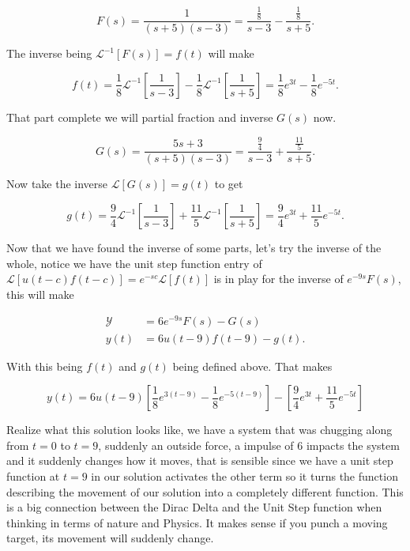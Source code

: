 \documentclass[12pt]{article}
\newcommand{\lp}{\mathscr{L}}
\newcommand{\hugey}{\mathscr{Y}}
\begin{document}
\begin{equation*}
    F(s)=\frac{1}{(s+5)(s-3)} = \frac{\frac{1}{8}}{s-3}-\frac{\frac{1}{8}}{s+5}.
\end{equation*}

The inverse being $\lp^{-1}[F(s)]=f(t)$ will make

\begin{equation*}
    f(t)=\frac{1}{8}\lp^{-1}\left[\frac{1}{s-3}\right]-\frac{1}{8}\lp^{-1}\left[\frac{1}{s+5}\right]=\frac{1}{8}e^{3t}-\frac{1}{8}e^{-5t}.
\end{equation*}

That part complete we will partial fraction and inverse $G(s)$ now.

\begin{equation*}
    G(s)=\frac{5s+3}{(s+5)(s-3)}=\frac{\frac{9}{4}}{s-3}+\frac{\frac{11}{5}}{s+5}.
\end{equation*}

Now take the inverse $\lp[G(s)]=g(t)$ to get

\begin{equation*}
    g(t)=\frac{9}{4}\lp^{-1}\left[\frac{1}{s-3}\right]+\frac{11}{5}\lp^{-1}\left[\frac{1}{s+5}\right]=\frac{9}{4}e^{3t}+\frac{11}{5}e^{-5t}.
\end{equation*}

Now that we have found the inverse of some parts, let's try the inverse of the whole, notice we have the unit step function entry of $\lp[u(t-c)f(t-c)]=e^{-sc}\lp[f(t)]$ is in play for the inverse of $e^{-9s}F(s)$, this will make

\begin{align*}
    \hugey &= 6e^{-9s}F(s)-G(s) \\
    y(t) &= 6u(t-9)f(t-9)-g(t).
\end{align*}

With this being $f(t)$ and $g(t)$ being defined above. That makes 

\begin{equation*}
    y(t) = 6u(t-9)\left[\frac{1}{8}e^{3(t-9)}-\frac{1}{8}e^{-5(t-9)}\right]-\left[\frac{9}{4}e^{3t}+\frac{11}{5}e^{-5t}\right]
\end{equation*}

Realize what this solution looks like, we have a system that was chugging along from $t=0$ to $t=9$, suddenly an outside force, a impulse of 6 impacts the system and it suddenly changes how it moves, that is sensible since we have a unit step function at $t=9$ in our solution activates the other term so it turns the function describing the movement of our solution into a completely different function. This is a big connection between the Dirac Delta and the Unit Step function when thinking in terms of nature and Physics. It makes sense if you punch a moving target, its movement will suddenly change.
\end{document}
